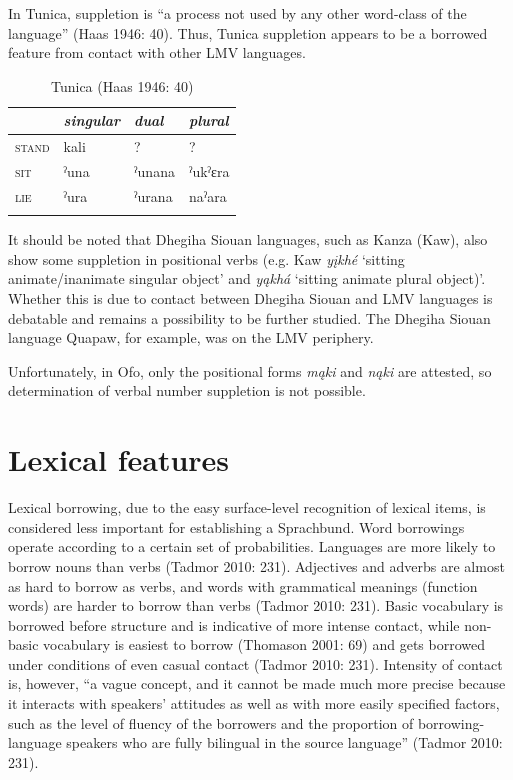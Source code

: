 \documentclass[output=paper]{LSP/langsci}
\begin{document}
In Tunica, suppletion is “a process not used by any other word-class of the language” (Haas 1946: 40). Thus, Tunica suppletion appears to be a borrowed feature from contact with other LMV languages.

\begin{table}
\caption{Tunica (Haas 1946: 40)}
\begin{tabular}{llll}
\lsptoprule
& \emph{singular} & \emph{dual} & \emph{plural} \\
\midrule
 \textsc{stand} & kali\footnotemark & ? & ? \\
\textsc{sit} & ˀuna & ˀunana & ˀukˀɛra \\
\textsc{lie} & ˀura & ˀurana & naˀara \\
\lspbottomrule
\end{tabular} 
\end{table}

	It should be noted that Dhegiha Siouan languages, such as Kanza (Kaw), also show some suppletion in positional verbs (e.g. Kaw \emph{yįkhé} `sitting animate/inanimate singular object' and \emph{yąkhá} `sitting animate plural object)'. Whether this is due to contact between Dhegiha Siouan and LMV languages is debatable and remains a possibility to be further studied. The Dhegiha Siouan language Quapaw, for example, was on the LMV periphery.

Unfortunately, in Ofo, only the positional forms \emph{mąki} and \emph{nąki} are attested, so determination of verbal number suppletion is not possible.

\section{Lexical features}

	Lexical borrowing, due to the easy surface-level recognition of lexical items, is considered less important for establishing a Sprachbund. Word borrowings operate according to a certain set of probabilities. Languages are more likely to borrow nouns than verbs (Tadmor 2010: 231). Adjectives and adverbs are almost as hard to borrow as verbs, and words with grammatical meanings (function words) are harder to borrow than verbs (Tadmor 2010: 231). Basic vocabulary is borrowed before structure and is indicative of more intense contact, while non-basic vocabulary is easiest to borrow (Thomason 2001: 69) and gets borrowed under conditions of even casual contact (Tadmor 2010: 231). Intensity of contact is, however, “a vague concept, and it cannot be made much more precise because it interacts with speakers’ attitudes as well as with more easily specified factors, such as the level of fluency of the borrowers and the proportion of borrowing-language speakers who are fully bilingual in the source language” (Tadmor 2010: 231). 
\end{document}
